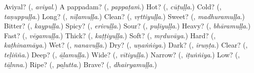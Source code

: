 \begin{tcolorbox}[breakable,colback=teal!4,colframe=teal!35!black,title={Before you move on}]
Aviyal? (\textbf{}, \emph{aviyal}.) A pappadam? (\textbf{}, \emph{pappaṭaṁ}.) Hot? (\textbf{}, \emph{cūṭuḷḷa}.) Cold? (\textbf{}, \emph{taṇuppuḷḷa}.) Long? (\textbf{}, \emph{nīḷamuḷḷa}.) Clean? (\textbf{}, \emph{vṛttiyuḷḷa}.) Sweet? (\textbf{}, \emph{madhuramuḷḷa}.) Bitter? (\textbf{}, \emph{kaypuḷḷa}.) Spicy? (\textbf{}, \emph{erivuḷḷa}.) Sour? (\textbf{}, \emph{puḷiyuḷḷa}.) Heavy? (\textbf{}, \emph{bhāramuḷḷa}.) Fast? (\textbf{}, \emph{vēgamuḷḷa}.) Thick? (\textbf{}, \emph{kaṭṭiyuḷḷa}.) Soft? (\textbf{}, \emph{mṛduvāya}.) Hard? (\textbf{}, \emph{kaṭhinamāya}.) Wet? (\textbf{}, \emph{nanavuḷḷa}.) Dry? (\textbf{}, \emph{uṇaṅṅiya}.) Dark? (\textbf{}, \emph{iruṇṭa}.) Clear? (\textbf{}, \emph{teḷiñña}.) Deep? (\textbf{}, \emph{āḻamuḷḷa}.) Wide? (\textbf{}, \emph{vītiyuḷḷa}.) Narrow? (\textbf{}, \emph{iṭuṅṅiya}.) Low? (\textbf{}, \emph{tāḻnna}.) Ripe? (\textbf{}, \emph{paḻutta}.) Brave? (\textbf{}, \emph{dhairyamuḷḷa}.)
\end{tcolorbox}
